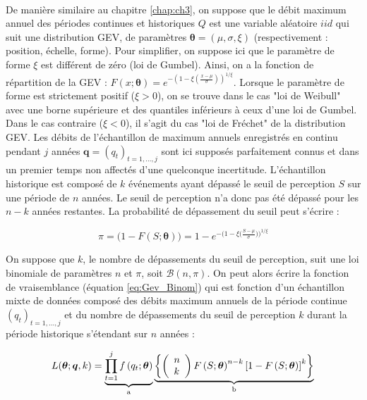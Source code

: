 		\paragraph{} De manière similaire au chapitre \ref{chap:ch3}, on suppose que le débit maximum annuel des périodes continues et historiques $Q$ est une variable aléatoire $iid$ qui suit une distribution GEV, de paramètres $\boldsymbol{\theta} = (\mu,\sigma,\xi)$ (respectivement : position, échelle, forme). Pour simplifier, on suppose ici que le paramètre de forme $\xi$ est différent de zéro (loi de Gumbel). Ainsi, on a la fonction de répartition de la GEV : $F(x;\boldsymbol{\theta}) = e^{-(1-\xi(\frac{x - \mu}{\sigma}))^{1/\xi}}$. Lorsque le paramètre de forme est strictement positif ($\xi > 0$), on se trouve dans le cas "loi de Weibull" avec une borne supérieure et des quantiles inférieurs à ceux d'une loi de Gumbel. Dans le cas contraire ($\xi < 0$), il s'agit du cas "loi de Fréchet" de la distribution GEV. Les débits de l'échantillon de maximum annuels enregistrés en continu pendant $j$ années $\boldsymbol{q}= (q_t)_{t=1,...,j}$ sont ici supposés parfaitement connus et dans un premier temps non affectés d'une quelconque incertitude. L'échantillon historique est composé de $k$ événements ayant dépassé le seuil de perception $S$ sur une période de $n$ années. Le seuil de perception n'a donc pas été dépassé pour les $n-k$ années restantes. La probabilité de dépassement du seuil peut s'écrire :
		
		\begin{equation}
			\pi = \biggl( 1 - F(S;\boldsymbol{\theta})\biggl) = 1 - e^{-\biggl(1-\xi\bigl(\frac{S-\mu}{\sigma}\bigl)\biggl)^{1/\xi} }		
		\end{equation}
			 
	On suppose que $k$, le nombre de dépassements du seuil de perception, suit une loi binomiale de paramètres $n$ et $\pi$, soit $\mathcal{B}(n,\pi)$. On peut alors écrire la fonction de vraisemblance (équation \ref{eq:Gev_Binom}) qui est fonction d'un échantillon mixte de données composé des débits maximum annuels de la période continue $(q_t)_{t=1,...,j}$ et du nombre de dépassements du seuil de perception $k$ durant la période historique s'étendant sur $n$ années :
		
			\begin{equation}
			L(\boldsymbol{\theta} ; \boldsymbol{q}, k) = \underbrace{\prod_{t=1}^j f\left(q_t;\boldsymbol{\theta}\right)}_{\mathrm{a}} \underbrace{\left\{\left(\begin{array}{l}
			n \\
			k
			\end{array}\right) F\left(S;\boldsymbol{\theta}\right)^{n-k}\left[1-F\left(S;\boldsymbol{\theta}\right)\right]^k\right\}}_{\mathrm{b}} \\
			\label{eq:Gev_Binom}
			\end{equation}
			
